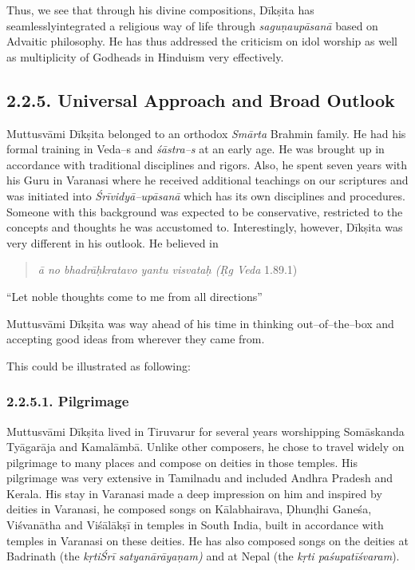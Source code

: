 Thus, we see that through his divine compositions, Dīkṣita has seamlesslyintegrated a religious way of life through \textit{saguṇaupāsanā} based on Advaitic philosophy. He has thus addressed the criticism on idol worship as well as multiplicity of Godheads in Hinduism very effectively.

\newpage

\subsection*{2.2.5. Universal Approach and Broad Outlook}

Muttusvāmi Dīkṣita belonged to an orthodox \textit{Smārta} Brahmin family. He had his formal training in Veda–s and \textit{śāstra–s} at an early age. He was brought up in accordance with traditional disciplines and rigors. Also, he spent seven years with his Guru in Varanasi where he received additional teachings on our scriptures and was initiated into \textit{Śrīvidyā–upāsanā} which has its own disciplines and procedures. Someone with this background was expected to be conservative, restricted to the concepts and thoughts he was accustomed to. Interestingly, however, Dīkṣita was very different in his outlook. He believed in

\begin{verse}
\textit{ā no bhadrāḥkratavo yantu visvataḥ (Ṛg Veda} 1.89.1)
\end{verse}

“Let noble thoughts come to me from all directions”

Muttusvāmi Dīkṣita was way ahead of his time in thinking out–of–the–box and accepting good ideas from wherever they came from.

This could be illustrated as following:

\subsubsection*{2.2.5.1. Pilgrimage}

Muttusvāmi Dīkṣita lived in Tiruvarur for several years worshipping Somāskanda Tyāgarāja and Kamalāmbā. Unlike other composers, he chose to travel widely on pilgrimage to many places and compose on deities in those temples. His pilgrimage was very extensive in Tamilnadu and included Andhra Pradesh and Kerala. His stay in Varanasi made a deep impression on him and inspired by deities in Varanasi, he composed songs on Kālabhairava, Ḍhunḍhi Ganeśa, Viśvanātha and Viśālākṣī in temples in South India, built in accordance with temples in Varanasi on these deities. He has also composed songs on the deities at Badrinath (the \textit{kṛtiŚrī satyanārāyaṇam)} and at Nepal (the\textit{ kṛti paśupatīśvaram}).

